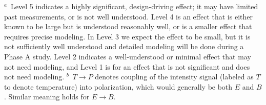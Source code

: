 \begin{table}[h!]
{\begin{tabular}{@{}p{4.5cm} @{}c p{1.5cm} @{~}c@{} p{0.5cm} @{}p{3.0cm} @{}c p{1.5cm} @{~}c@{}}
\cline{1-4}
\cline{6-9}
\end{tabular}
\vskip 3pt
} %
 \noindent
 \footnotesize
 {$^{a}$}~Level 5 indicates a highly significant, design-driving effect; it may have limited past measurements, or is not well understood.  Level 4 is an effect that is either known to be large but is understood reasonably well, or is a smaller effect that requires precise modeling.  In Level 3 we expect the effect to be small, but it is not sufficiently well understood and detailed modeling will be done during a Phase A study. Level 2 indicates a well-understood or minimal effect that may not need modeling, and Level 1 is for an effect that is not significant and  does not need modeling.\qquad
 {$^{b}$}~$T \rightarrow P $ denotes coupling of the intensity signal (labeled as $T$ to denote temperature) into polarization, which would generally be both $E$ and $B$. Similar meaning holds for $E \rightarrow B$.\par
\end{table}



